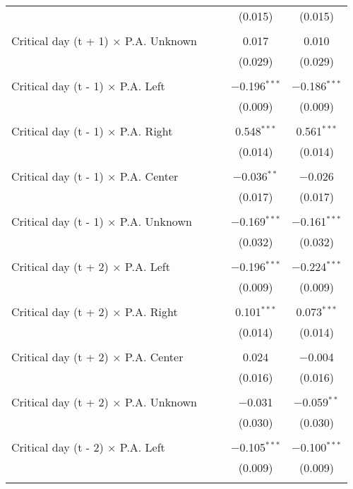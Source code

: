 \documentclass[
]{article}
\begin{document}
\begin{table}[!htbp]
{\begin{tabular}{@{\extracolsep{5pt}}lcccc}
  &  &  & (0.015) & (0.015) \\ 
  & & & & \\ 
 Critical day (t + 1) $\times$ P.A. Unknown &  &  & 0.017 & 0.010 \\ 
  &  &  & (0.029) & (0.029) \\ 
  & & & & \\ 
 Critical day (t - 1) $\times$ P.A. Left &  &  & $-$0.196$^{***}$ & $-$0.186$^{***}$ \\ 
  &  &  & (0.009) & (0.009) \\ 
  & & & & \\ 
 Critical day (t - 1) $\times$ P.A. Right &  &  & 0.548$^{***}$ & 0.561$^{***}$ \\ 
  &  &  & (0.014) & (0.014) \\ 
  & & & & \\ 
 Critical day (t - 1) $\times$ P.A. Center &  &  & $-$0.036$^{**}$ & $-$0.026 \\ 
  &  &  & (0.017) & (0.017) \\ 
  & & & & \\ 
 Critical day (t - 1) $\times$ P.A. Unknown &  &  & $-$0.169$^{***}$ & $-$0.161$^{***}$ \\ 
  &  &  & (0.032) & (0.032) \\ 
  & & & & \\ 
 Critical day (t + 2) $\times$ P.A. Left &  &  & $-$0.196$^{***}$ & $-$0.224$^{***}$ \\ 
  &  &  & (0.009) & (0.009) \\ 
  & & & & \\ 
 Critical day (t + 2) $\times$ P.A. Right &  &  & 0.101$^{***}$ & 0.073$^{***}$ \\ 
  &  &  & (0.014) & (0.014) \\ 
  & & & & \\ 
 Critical day (t + 2) $\times$ P.A. Center &  &  & 0.024 & $-$0.004 \\ 
  &  &  & (0.016) & (0.016) \\ 
  & & & & \\ 
 Critical day (t + 2) $\times$ P.A. Unknown &  &  & $-$0.031 & $-$0.059$^{**}$ \\ 
  &  &  & (0.030) & (0.030) \\ 
  & & & & \\ 
 Critical day (t - 2) $\times$ P.A. Left &  &  & $-$0.105$^{***}$ & $-$0.100$^{***}$ \\ 
  &  &  & (0.009) & (0.009) \\ 
  & & & & \\ 

\end{tabular}}
\end{table}
\end{document}
